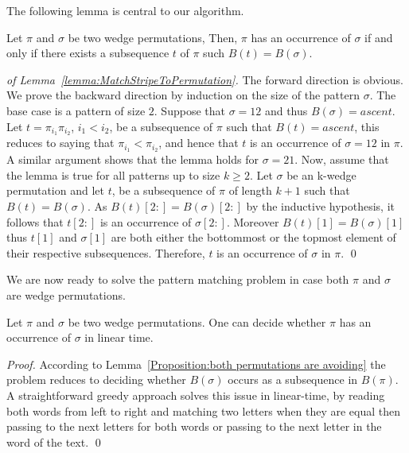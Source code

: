\documentclass[a4paper]{llncs}
\newcommand{\bijection}{B}
\begin{document}
The following lemma is central to our algorithm.

\begin{lemma}
\label{lemma:MatchStripeToPermutation}
Let $\pi$ and $\sigma$ be two wedge permutations,
Then, $\pi$ has an occurrence of $\sigma$ if and only if 
there exists a subsequence $t$ of $\pi$ such $\bijection(t)=\bijection(\sigma)$.
\end{lemma}

\begin{proof}[of Lemma~\ref{lemma:MatchStripeToPermutation}]
The forward direction is obvious.
We prove the backward direction by induction on the size of the pattern
$\sigma$.
The base case is a pattern of size $2$.
Suppose that $\sigma = 12$ and thus $\bijection(\sigma) = ascent$.
Let $t = \pi_{i_1}\pi_{i_2}$, $i_1 < i_2$, be a subsequence of $\pi$
such that $\bijection(t) = ascent$, this reduces to saying that
$\pi_{i_1} < \pi_{i_2}$, 
and hence that $t$ is an occurrence of $\sigma = 12$ in $\pi$.
A similar argument shows that the lemma holds for $\sigma = 21$.
Now, assume that the lemma is true for all patterns up to size $k \geq 2$.
Let $\sigma$ be an k-wedge permutation and
let $t$,
be a subsequence of $\pi$ of length $k+1$ such that
$\bijection(t) = \bijection(\sigma)$.
As $\bijection(t)[2:] = \bijection(\sigma)[2:]$
by the inductive hypothesis, it follows that
$t[2:]$ is an occurrence of $\sigma[2:]$.
Moreover $\bijection(t)[1] = \bijection(\sigma)[1]$ 
thus $t[1]$ and $\sigma[1]$ are both either the bottommost or the topmost
element of their respective subsequences.
Therefore, $t$ is an occurrence of $\sigma$ in $\pi$.
\qed
\end{proof}

We are now ready to solve the pattern matching problem in case
both $\pi$ and $\sigma$ are wedge permutations.

\begin{proposition}
\label{Proposition:both permutations are avoiding}
Let $\pi$ and $\sigma$ be two wedge permutations.
One can decide whether $\pi$ has an occurrence of $\sigma$ in linear time.
\end{proposition}

\begin{proof}
According to Lemma~\ref{Proposition:both permutations are avoiding} the problem reduces
to deciding whether $\bijection(\sigma)$ occurs as a subsequence in $\bijection(\pi)$.
A straightforward greedy approach solves this issue in linear-time,
by reading both words from left to right and matching two letters when they are equal then passing
to the next letters for both words
or passing to the next letter in the word of the text.
\qed
\end{proof}
\end{document}
